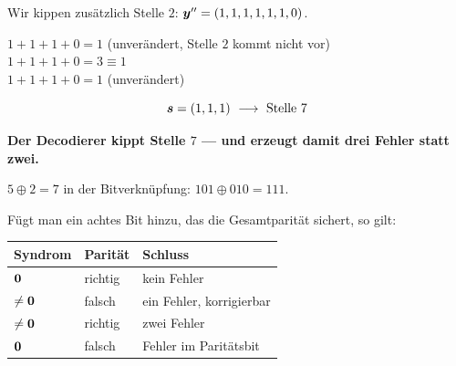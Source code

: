 \begin{aufgabe}
Wir kippen zusätzlich Stelle $2$: $\boldsymbol{y}'' = (1,1,1,1,1,1,0)$.

 $1+1+1+0 = 1$ (unverändert, Stelle $2$ kommt nicht vor)\\
 $1+1+1+0 = 3 \equiv 1$\\
 $1+1+1+0 = 1$ (unverändert)

\[ \vek{s} = (1,1,1) \ \longrightarrow\ \text{Stelle } 7 \]

\begin{center}
\begin{minipage}{0.9\textwidth}
\textbf{Der Decodierer kippt Stelle $7$ --- und erzeugt damit drei Fehler statt zwei.}
\end{minipage}
\end{center}

 $5 \oplus 2 = 7$ in der Bitverknüpfung: $101 \oplus 010 = 111$. \checkmark

\begin{center}
\begin{minipage}{0.88\textwidth}
\end{minipage}
\end{center}

Fügt man ein achtes Bit hinzu, das die Gesamtparität sichert, so gilt:
\begin{center}
{\small
\renewcommand{\arraystretch}{1.48}
\begin{tabular}{@{}P{1.8cm}P{2.0cm}P{2.8cm}@{}}
\toprule
\textbf{Syndrom} & \textbf{Parität} & \textbf{Schluss}\\
\midrule
$\boldsymbol{0}$ & richtig & kein Fehler\\
$\ne\boldsymbol{0}$ & falsch & ein Fehler, korrigierbar\\
$\ne\boldsymbol{0}$ & richtig & \textcolor{akzent}{zwei Fehler}\\
$\boldsymbol{0}$ & falsch & Fehler im Paritätsbit\\
\bottomrule
\end{tabular}}
\end{center}

\begin{center}
\begin{minipage}{0.86\textwidth}
\end{minipage}
\end{center}
\end{aufgabe}

